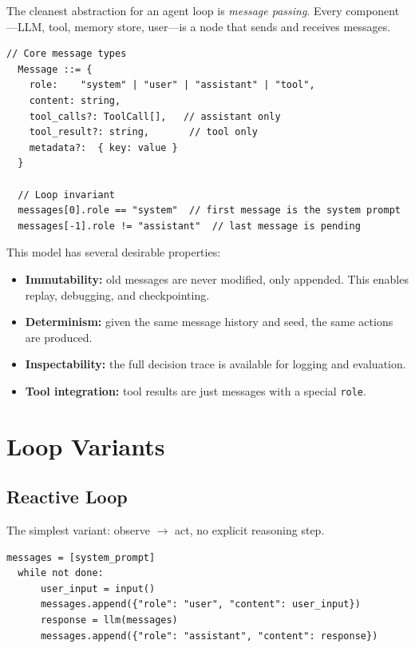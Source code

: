 The cleanest abstraction for an agent loop is \emph{message passing}. Every component---LLM, tool, memory store, user---is a node that sends and receives messages.

\begin{lstlisting}[caption=Message types in the agent loop]
  // Core message types
  Message ::= {
    role:    "system" | "user" | "assistant" | "tool",
    content: string,
    tool_calls?: ToolCall[],   // assistant only
    tool_result?: string,       // tool only
    metadata?:  { key: value }
  }

  // Loop invariant
  messages[0].role == "system"  // first message is the system prompt
  messages[-1].role != "assistant"  // last message is pending
\end{lstlisting}

This model has several desirable properties:
\begin{itemize}
	\item \textbf{Immutability:} old messages are never modified, only appended. This enables replay, debugging, and checkpointing.
	\item \textbf{Determinism:} given the same message history and seed, the same actions are produced.
	\item \textbf{Inspectability:} the full decision trace is available for logging and evaluation.
	\item \textbf{Tool integration:} tool results are just messages with a special \texttt{role}.
\end{itemize}

\section{Loop Variants}

\subsection{Reactive Loop}

The simplest variant: observe $\to$ act, no explicit reasoning step.

\begin{lstlisting}[caption=Reactive agent loop]
  messages = [system_prompt]
  while not done:
      user_input = input()
      messages.append({"role": "user", "content": user_input})
      response = llm(messages)
      messages.append({"role": "assistant", "content": response})
\end{lstlisting}


